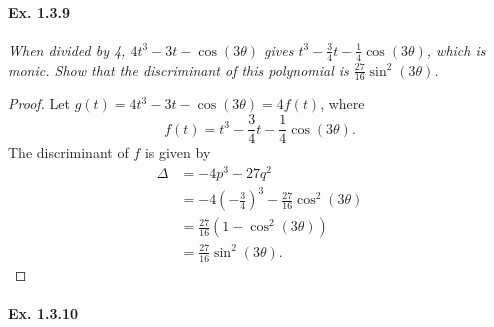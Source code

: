 \documentclass[11pt,a4paper]{article}
\begin{document}
\paragraph{Ex. 1.3.9}

{\it When divided by 4, $4t^3 - 3t - \cos(3\theta)$ gives $t^3 -\frac{3}{4} t - \frac{1}{4}\cos(3\theta)$, which is monic. Show that the discriminant of this polynomial is $\frac{27}{16} \sin^2(3\theta)$.
}

\begin{proof}
Let $g(t) = 4 t^3-3t -\cos(3\theta) = 4 f(t)$, where 
$$f(t) = t^3 -\frac{3}{4}t - \frac{1}{4} \cos(3\theta).$$
The discriminant of $f$ is given by
\begin{align*}
\Delta &= -4 p^3 -27q^2\\
& = -4\left(-\frac{3}{4}\right)^3 - \frac{27}{16} \cos^2(3\theta)\\
&= \frac{27}{16}(1-\cos^2(3\theta))\\
&= \frac{27}{16} \sin^2(3 \theta).
\end{align*}
\end{proof}

\paragraph{Ex. 1.3.10}
\end{document}
